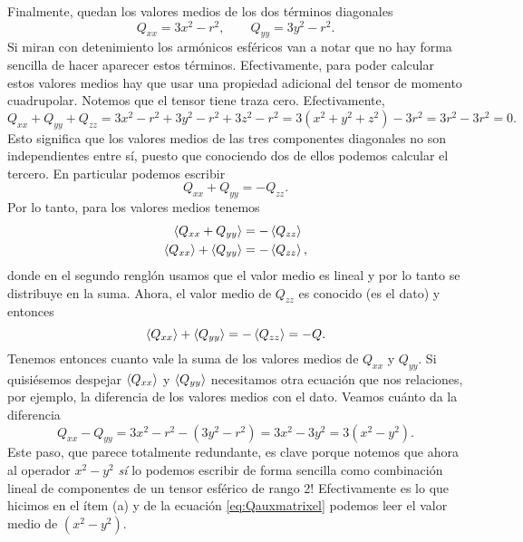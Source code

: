 \documentclass[10pt, a4paper]{article}
\numberwithin{equation}{subsection}
\begin{document}
Finalmente, quedan los valores medios de los dos términos diagonales
\begin{equation}
  Q_{xx} = 3x^2 - r^2, \qquad
  Q_{yy} = 3y^2 - r^2.
\end{equation}
Si miran con detenimiento los armónicos esféricos van a notar que no hay forma
sencilla de hacer aparecer estos términos. Efectivamente, para poder calcular
estos valores medios hay que usar una propiedad adicional del tensor de momento
cuadrupolar. Notemos que el tensor tiene traza cero. Efectivamente,
\begin{equation}
  Q_{xx} + Q_{yy} + Q_{zz}
  = 3x^2 - r^2 + 3y^2 - r^2 + 3z^2 - r^2
  = 3\left(x^2 + y^2 + z^2\right) - 3r^2
  = 3r^2 - 3r^2 = 0.
\end{equation}
Esto significa que los valores medios de las tres componentes diagonales no
son independientes entre sí, puesto que conociendo dos de ellos podemos
calcular el tercero. En particular podemos escribir
\begin{equation}
  Q_{xx} + Q_{yy} = -Q_{zz}.
\end{equation}
Por lo tanto, para los valores medios tenemos
\begin{align}
  \expval{Q_{xx} + Q_{yy}} &= -\expval{Q_{zz}} \\
  \expval{Q_{xx}} + \expval{Q_{yy}} &= -\expval{Q_{zz}},
\end{align}
donde en el segundo renglón usamos que el valor medio es lineal y por lo tanto
se distribuye en la suma. Ahora, el valor medio de $Q_{zz}$ es conocido (es el
dato) y entonces
\begin{equation}
  \expval{Q_{xx}} + \expval{Q_{yy}} = -\expval{Q_{zz}} = - Q.
\end{equation}
Tenemos entonces cuanto vale la suma de los valores medios de $Q_{xx}$ y
$Q_{yy}$. Si quisiésemos despejar $\expval{Q_{xx}}$ y $\expval{Q_{yy}}$
necesitamos otra ecuación que nos relaciones, por ejemplo, la diferencia de los
valores medios con el dato. Veamos cuánto da la diferencia
\begin{equation}
  Q_{xx} - Q_{yy} = 3x^2 - r^2 - \left(3y^2 - r^2\right) = 3x^2 - 3y^2
  = 3(x^2 - y^2).
\end{equation}
Este paso, que parece totalmente redundante, es clave porque notemos que ahora
al operador $x^2 - y^2$ \emph{sí} lo podemos escribir de forma sencilla como
combinación lineal de componentes de un tensor esférico de rango 2!
Efectivamente es lo que hicimos en el ítem (a) y de la ecuación
\eqref{eq:Qauxmatrixel} podemos leer el valor medio de $(x^2 - y^2)$.
\end{document}
